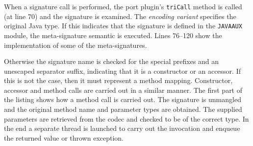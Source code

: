 {
\scriptsize
\renewcommand\verbatimtabsize{4\relax}
}

When a signature call is performed, the port plugin's \verb=triCall= method
is called (at line 70) and the signature is examined.
The \emph{encoding variant} specifies the original Java type.
If this indicates that the signature is defined in the \verb=JAVAAUX= module,
the meta-signature semantic is executed.
Lines 76--120 show the implementation of some of the meta-signatures.

Otherwise the signature name is checked for the special prefixes
and an unescaped separator suffix,
indicating that it is a constructor or an accessor.
If this is not the case, then it must represent a method mapping.
Constructor, accessor and method calls are carried out in a similar manner.
The first part of the listing shows how a method call is carried out.
The signature is unmangled and the original method name
and parameter types are obtained.
The supplied parameters are retrieved from the codec
and checked to be of the correct type.
In the end a separate thread is launched to carry out the invocation
and enqueue the returned value or thrown exception.
